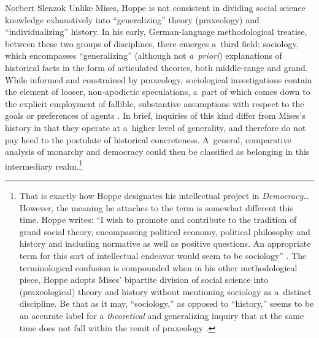 \begin{artengenv}{Norbert Slenzok}
Unlike Mises, Hoppe is not consistent in dividing social science knowledge exhaustively into ``generalizing'' theory (praxeology) and ``individualizing'' history. In his early, German-language methodological treatise, between these two groups of disciplines, there emerges a~third field: sociology, which encompasses ``generalizing'' (although not \textit{a~priori}) explanations of historical facts in the form of articulated theories, both middle-range and grand. While informed and constrained by praxeology, sociological investigations contain the element of looser, non-apodictic speculations, a~part of which comes down to the explicit employment of fallible, substantive assumptions with respect to the goals or preferences of agents 
\parencite[][pp.33–38]{hoppe_kritik_1983}. %
 In brief, inquiries of this kind differ from Mises's history in that they operate at a~higher level of generality, and therefore do not pay heed to the postulate of historical concreteness. A~general, comparative analysis of monarchy and democracy could then be classified as belonging in this intermediary realm.\footnote{That is exactly how Hoppe designates his intellectual project in \textit{Democracy}… However, the meaning he attaches to the term is somewhat different this time. Hoppe writes: ``I wish to promote and contribute to the tradition of grand social theory, encompassing political economy, political philosophy and history and including normative as well as positive questions. An appropriate term for this sort of intellectual endeavor would seem to be sociology'' 
\parencite[][p.xxiv]{hoppe_democracy_2007}. %
 The terminological confusion is compounded when in his other methodological piece, Hoppe 
\parencite[][p.43]{hoppe_economic_2007} %
 adopts Mises' bipartite division of social science into (praxeological) theory and history without mentioning sociology as a~distinct discipline. Be that as it may, ``sociology,'' as opposed to ``history,'' seems to be an accurate label for a \textit{theoretical} and generalizing inquiry that at the same time does not fall within the remit of praxeology 
\parencite[on the standing of sociology in the Misesian tradition, see][]{robitaille_ludwig_2019}.%
}




\end{artengenv}
